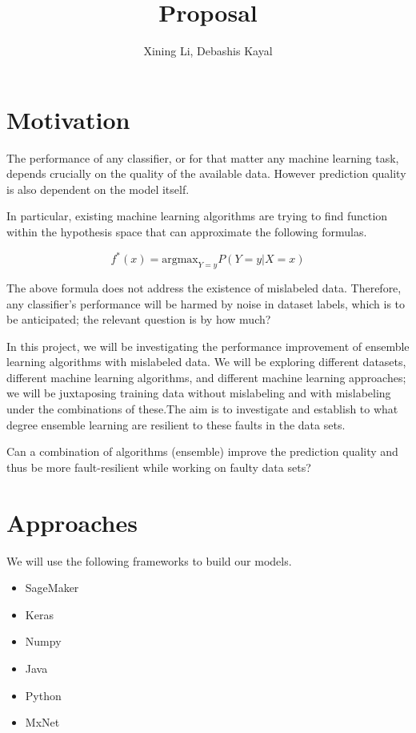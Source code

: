 \documentclass{article}
\author{Xining Li, Debashis Kayal}
\title {Proposal}
\begin{document}
\maketitle

\section{Motivation}

The performance of any classifier, or for that matter any machine learning task, depends crucially on the quality of the available data. However prediction quality is also dependent on the model itself. 

In particular, existing machine learning algorithms are trying to find function within the hypothesis space that can approximate the following formulas. 

\begin{equation}
    f^*(x) = {\mathrm {argmax}}_{Y=y} P (Y=y|X=x)
\end{equation}

The above formula does not address the existence of mislabeled data. Therefore, any classifier's performance will be harmed by noise in dataset labels, which is to be anticipated; the relevant question is by how much? 

In this project, we will be investigating the performance improvement of ensemble learning algorithms with mislabeled data. We will be exploring different datasets, different machine learning algorithms, and different machine learning approaches; we will be juxtaposing training data without mislabeling and with mislabeling under the combinations of these.The aim is to investigate and establish to what degree ensemble learning are resilient to these faults in the data sets.  

Can a combination of algorithms (ensemble) improve the prediction quality and thus be more fault-resilient while working on faulty data sets?   

\section{Approaches}

We will use the following frameworks to build our models. 

\begin{itemize}
    \item SageMaker
    \item Keras
    \item Numpy
    \item Java
    \item Python    
    \item MxNet
\end{itemize}
\end{document}

